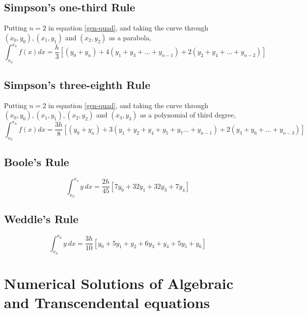 \documentclass[12pt,a4paper,landscape]{article}
\begin{document}
	\subsection{Simpson's one-third Rule}
		Putting $n=2$ in equation \ref{gen-quad}, and taking the curve through $(x_0 , y_0), (x_1, y_1)$ and $(x_2,y_2)$ as a parabola,
		\begin{equation}\label{simpson-13}
			\boxed{\int_{x_0}^{x_n}f(x)dx = \dfrac{h}{3}\left[(y_0 + y_n) + 4(y_1 + y_3 + \ldots + y_{n-1}) + 2(y_2 + y_4 + \ldots + y_{n-2})\right]}
		\end{equation}
	
	\subsection{Simpson's three-eighth Rule}
		Putting $n=2$ in equation \ref{gen-quad}, and taking the curve through $(x_0 , y_0), (x_1, y_1), (x_2,y_2)$ and $(x_3,y_3)$ as a polynomial of third degree,
		\begin{equation}\label{simpson-38}
		\boxed{\int_{x_0}^{x_n}f(x)dx = \dfrac{3h}{8}\left[(y_0 + y_n) + 3(y_1 + y_2 + y_4 + y_5 + y_7 \ldots + y_{n-1}) + 2(y_3 + y_6 + \ldots + y_{n-3})\right]}
		\end{equation}
	\subsection{Boole's Rule}
	\begin{equation}\label{boole}
		\int_{x_0}^{x_4} y\ dx = \dfrac{2h}{45}\left[ 7y_0 + 32y_1 + 32 y_3 + 7y_4 \right]
	\end{equation}
	\subsection{Weddle's Rule}
	\begin{equation}\label{weddle}
		\int_{x_0}^{x_6} y\ dx = \dfrac{3h}{10}\left[y_0 + 5y_1 + y_2 + 6y_3 + y_4 + 5 y_5 + y_6 \right]
	\end{equation}
	
	\section{Numerical Solutions of Algebraic and Transcendental equations}
	
	
\end{document}
